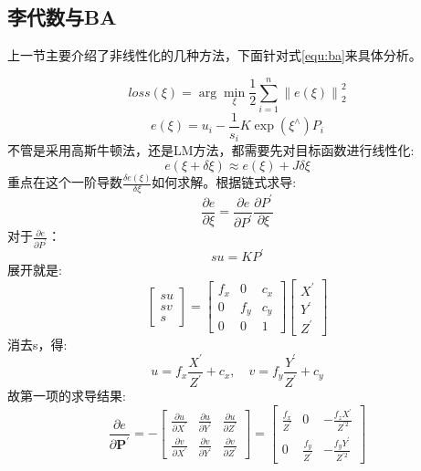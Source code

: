 \subsection{李代数与BA}
上一节主要介绍了非线性化的几种方法，下面针对式\ref{equ:ba}来具体分析。\par
$$loss(\xi)=\arg \min _{\xi} \frac{1}{2} \sum_{i=1}^{n}\left\|e(\xi)\right\|_{2}^{2}$$
$$e(\xi)=u_{i}-\frac{1}{s_{i}} K \exp \left(\xi^{\wedge}\right) P_{i}$$
不管是采用高斯牛顿法，还是LM方法，都需要先对目标函数进行线性化:
\begin{equation}
e(\xi+\delta \xi) \approx e(\xi)+J \delta \xi
\end{equation}
重点在这个一阶导数$\frac{\delta e(\xi)}{\delta \xi}$如何求解。根据链式求导:
\begin{equation}
\frac{\partial e}{\partial \xi}=\frac{\partial e}{\partial P^{\prime}} \frac{\partial P^{\prime}}{\partial \xi}
\end{equation}
对于$\frac{\partial e}{\partial P^{\prime}}$：
\begin{equation}
s u=K P^{\prime}
\end{equation}
展开就是:
\begin{equation}
\left[ \begin{array}{c}{s u} \\ {s v} \\ {s}\end{array}\right]=\left[ \begin{array}{ccc}{f_{x}} & {0} & {c_{x}} \\ {0} & {f_{y}} & {c_{y}} \\ {0} & {0} & {1}\end{array}\right] \left[ \begin{array}{l}{X^{\prime}} \\ {Y^{\prime}} \\ {Z^{\prime}}\end{array}\right]
\end{equation}
消去s，得:
\begin{equation}
u=f_{x} \frac{X^{\prime}}{Z^{\prime}}+c_{x}, \quad v=f_{y} \frac{Y^{\prime}}{Z^{\prime}}+c_{y}
\end{equation}
故第一项的求导结果:
\begin{equation}
\frac{\partial e}{\partial \boldsymbol{P}^{\prime}}=-\left[ \begin{array}{ccc}{\frac{\partial u}{\partial X^{\prime}}} & {\frac{\partial u}{\partial Y^{\prime}}} & {\frac{\partial u}{\partial Z^{\prime}}} \\ {\frac{\partial v}{\partial X^{\prime}}} & {\frac{\partial v}{\partial Y^{\prime}}} & {\frac{\partial v}{\partial Z^{\prime}}}\end{array}\right]=\left[ \begin{array}{ccc}{\frac{f_{x}}{Z^{\prime}}} & {0} & {-\frac{f_{z} X^{\prime}}{Z^{\prime 2}}} \\ {0} & {\frac{f_{y}}{Z^{\prime}}} & {-\frac{f_{y} Y^{\prime}}{Z^{\prime 2}}}\end{array}\right]
\label{equ:epprime}
\end{equation}
